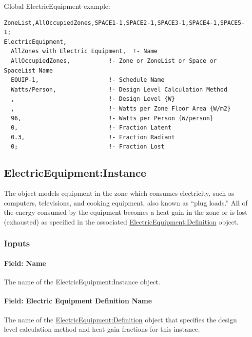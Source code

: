 Global ElectricEquipment example:

\begin{lstlisting}
ZoneList,AllOccupiedZones,SPACE1-1,SPACE2-1,SPACE3-1,SPACE4-1,SPACE5-1;
ElectricEquipment,
  AllZones with Electric Equipment,  !- Name
  AllOccupiedZones,           !- Zone or ZoneList or Space or SpaceList Name
  EQUIP-1,                    !- Schedule Name
  Watts/Person,               !- Design Level Calculation Method
  ,                           !- Design Level {W}
  ,                           !- Watts per Zone Floor Area {W/m2}
  96,                         !- Watts per Person {W/person}
  0,                          !- Fraction Latent
  0.3,                        !- Fraction Radiant
  0;                          !- Fraction Lost
\end{lstlisting}


\subsection{ElectricEquipment:Instance}\label{electricequipmentinstance}

The object models equipment in the zone which consumes electricity, such as computers, televisions, and cooking equipment, also known as ``plug loads.'' All of the energy consumed by the equipment becomes a heat gain in the zone or is lost (exhausted) as specified in the associated \hyperref[electricequipmentdefinition]{ElectricEquipment:Definition} object.

\subsubsection{Inputs}\label{inputs-3-019-ee-instance}

\paragraph{Field: Name}\label{field-name-3-017-ee-instance}

The name of the ElectricEquipment:Instance object.

\paragraph{Field: Electric Equipment Definition Name}\label{field-electric-equipment-definition-name}

The name of the \hyperref[electricequipmentdefinition]{ElectricEquipment:Definition} object that specifies the design level calculation method and heat gain fractions for this instance.

